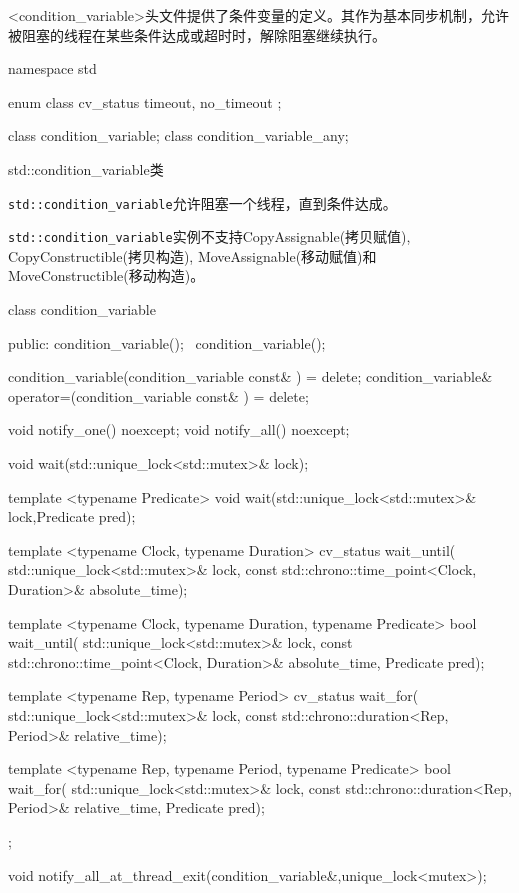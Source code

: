 
<condition\_variable>头文件提供了条件变量的定义。其作为基本同步机制，允许被阻塞的线程在某些条件达成或超时时，解除阻塞继续执行。


\begin{cpp}
namespace std
{
  enum class cv_status { timeout, no_timeout };

  class condition_variable;
  class condition_variable_any;
}
\end{cpp}

 {std::condition\_variable类}

\texttt{std::condition\_variable}允许阻塞一个线程，直到条件达成。

\texttt{std::condition\_variable}实例不支持CopyAssignable(拷贝赋值), CopyConstructible(拷贝构造), MoveAssignable(移动赋值)和 MoveConstructible(移动构造)。


\begin{cpp}
class condition_variable
{
public:
  condition_variable();
  ~condition_variable();

  condition_variable(condition_variable const& ) = delete;
  condition_variable& operator=(condition_variable const& ) = delete;

  void notify_one() noexcept;
  void notify_all() noexcept;

  void wait(std::unique_lock<std::mutex>& lock);

  template <typename Predicate>
  void wait(std::unique_lock<std::mutex>& lock,Predicate pred);

  template <typename Clock, typename Duration>
  cv_status wait_until(
       std::unique_lock<std::mutex>& lock,
       const std::chrono::time_point<Clock, Duration>& absolute_time);

  template <typename Clock, typename Duration, typename Predicate>
  bool wait_until(
       std::unique_lock<std::mutex>& lock,
       const std::chrono::time_point<Clock, Duration>& absolute_time,
       Predicate pred);

  template <typename Rep, typename Period>
  cv_status wait_for(
       std::unique_lock<std::mutex>& lock,
       const std::chrono::duration<Rep, Period>& relative_time);

  template <typename Rep, typename Period, typename Predicate>
  bool wait_for(
       std::unique_lock<std::mutex>& lock,
       const std::chrono::duration<Rep, Period>& relative_time,
       Predicate pred);
};

void notify_all_at_thread_exit(condition_variable&,unique_lock<mutex>);
\end{cpp}


